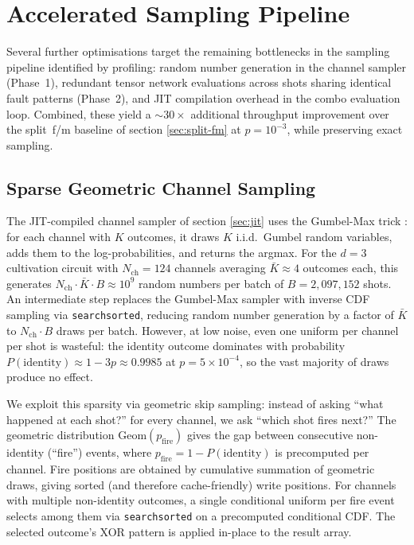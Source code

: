 \documentclass[a4paper,onecolumn,11pt,accepted=2026-06-10]{quantumarticle}
\begin{document}
\section{Accelerated Sampling Pipeline}
\label{sec:accelerated}

Several further optimisations target the remaining bottlenecks in the sampling pipeline identified by profiling: random number generation in the channel sampler (Phase~1), redundant tensor network evaluations across shots sharing identical fault patterns (Phase~2), and JIT compilation overhead in the combo evaluation loop. Combined, these yield a ${\sim}30\times$ additional throughput improvement over the split~f/m baseline of section \ref{sec:split-fm} at $p = 10^{-3}$, while preserving exact sampling.

\subsection{Sparse Geometric Channel Sampling}
\label{sec:sparse-geometric}

The JIT-compiled channel sampler of section \ref{sec:jit} uses the Gumbel-Max trick \cite{maddison2015asampling, gumbel1954}: for each channel with $K$ outcomes, it draws $K$ i.i.d.\ Gumbel random variables, adds them to the log-probabilities, and returns the argmax. For the $d{=}3$ cultivation circuit with $N_{\mathrm{ch}} = 124$ channels averaging $\bar{K} \approx 4$ outcomes
each, this generates $N_{\mathrm{ch}} \cdot \bar{K} \cdot B \approx 10^9$ random numbers per batch of $B = 2{,}097{,}152$ shots. An intermediate step replaces the Gumbel-Max sampler with inverse CDF sampling via \texttt{searchsorted}, reducing random number generation by a factor of $\bar{K}$ to $N_{\mathrm{ch}} \cdot B$ draws per batch. However, at low noise, even one uniform per channel per shot is wasteful: the identity outcome dominates with probability $P(\text{identity}) \approx 1 - 3p \approx 0.9985$ at $p = 5 \times 10^{-4}$, so the vast majority of draws produce no effect.

We exploit this sparsity via geometric skip sampling: instead of asking ``what happened at each shot?'' for every channel, we ask ``which shot fires next?'' The geometric distribution $\mathrm{Geom}(p_{\mathrm{fire}})$ gives the gap between consecutive non-identity (``fire'') events, where $p_{\mathrm{fire}} = 1 - P(\text{identity})$ is precomputed per channel. Fire positions are obtained by cumulative summation of geometric draws, giving sorted (and therefore cache-friendly) write positions. For channels with multiple non-identity outcomes, a single conditional uniform per fire event selects among them via \texttt{searchsorted} on a precomputed conditional CDF. The selected outcome's XOR pattern is applied in-place to the result array.
\end{document}
